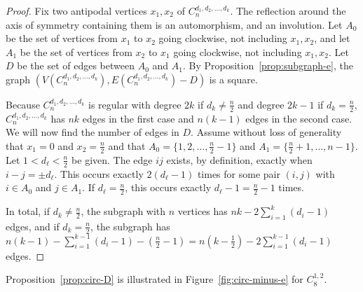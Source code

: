 \documentclass{article}
\theoremstyle{definition}
\begin{document}
\begin{proof} 
Fix two antipodal vertices $x_1, x_2$ of $C_{n}^{d_1,d_2, \ldots, d_k}$. The reflection around the axis of symmetry containing them is an automorphism, and an involution. Let $A_0$ be the set of vertices from $x_1$ to $x_2$ going clockwise, not including $x_1, x_2$, and let $A_1$ be the set of vertices from $x_2$ to $x_1$ going clockwise, not including $x_1, x_2$. Let $D$ be the set of edges between $A_0$ and $A_1$. By Proposition~\ref{prop:subgraph-e}, the graph $(V(C_{n}^{d_1,d_2, \ldots, d_k}),E(C_{n}^{d_1,d_2, \ldots, d_k})-D)$ is a square. 

Because $C_n^{d_1, d_2, \dotsc, d_k}$ is regular with degree $2k$ if $d_k \neq \frac{n}{2}$ and degree $2k-1$ if $d_k = \frac{n}{2}$, $C_n^{d_1, d_2, \dotsc, d_k}$ has $nk$ edges in the first case and $n(k-1)$ edges in the second case. We will now find the number of edges in $D$. Assume without loss of generality that $x_1 = 0$ and $x_2 = \frac{n}{2}$ and that $A_0 = \{1, 2, \dotsc, \frac{n}{2}-1\}$ and $A_1 = \{\frac{n}{2}+1, \dotsc, n-1\}$. Let $1 < d_\ell < \frac{n}{2}$ be given. The edge $ij$ exists, by definition, exactly when $i-j = \pm d_\ell$. This occurs exactly $2(d_\ell-1)$ times for some pair $(i,j)$ with $i \in A_0$ and $j \in A_1$. If $d_\ell = \frac{n}{2}$, this occurs exactly $d_\ell-1 = \frac{n}{2} - 1$ times.

In total, if $d_k \neq \frac{n}{2}$, the subgraph with $n$ vertices has $nk - 2 \sum_{i=1}^k (d_i-1)$ edges, and if $d_k = \frac{n}{2}$, the subgraph has $n(k-1) - \sum_{i=1}^{k-1} (d_i-1) - \left(\frac{n}{2}-1\right) = n\left(k-\frac{1}{2}\right)-2\sum_{i=1}^{k-1}(d_i-1)$ edges.
\end{proof}

Proposition~\ref{prop:circ-D} is illustrated in Figure~\ref{fig:circ-minus-e} for $C_8^{1,2}$. 
\end{document}
